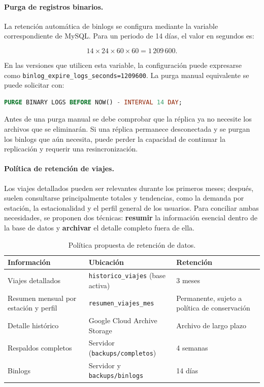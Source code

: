 \documentclass[10pt,a4paper]{article}
\begin{document}
\paragraph{Purga de registros binarios.}
La retención automática de binlogs se configura mediante la variable correspondiente de MySQL. Para un periodo de 14 días, el valor en segundos es:

\[
14 \times 24 \times 60 \times 60 = 1\,209\,600.
\]

En las versiones que utilicen esta variable, la configuración puede expresarse como 
\texttt{binlog\_expire\_logs\_seconds=1209600}. La purga manual equivalente se puede solicitar con:

\begin{lstlisting}[language=SQL]
PURGE BINARY LOGS BEFORE NOW() - INTERVAL 14 DAY;
\end{lstlisting}

Antes de una purga manual se debe comprobar que la réplica ya no necesite los archivos que se eliminarán. Si una réplica permanece desconectada y se purgan los binlogs que aún necesita, puede perder la capacidad de continuar la replicación y requerir una resincronización.

\paragraph{Política de retención de viajes.}
Los viajes detallados pueden ser relevantes durante los primeros meses; después, suelen consultarse principalmente totales y tendencias, como la demanda por estación, la estacionalidad y el perfil general de los usuarios. Para conciliar ambas necesidades, se proponen dos técnicas: \textbf{resumir} la información esencial dentro de la base de datos y \textbf{archivar} el detalle completo fuera de ella.

\begin{table}[htbp]
    \centering
    \small
    \begin{tabular}{|p{4.3cm}|p{5.3cm}|p{3.6cm}|}
        \hline
        \textbf{Información} & \textbf{Ubicación} & \textbf{Retención} \\ \hline
        Viajes detallados & \texttt{historico\_viajes} (base activa) & 3 meses \\ \hline
        Resumen mensual por estación y perfil & \texttt{resumen\_viajes\_mes} & Permanente, sujeto a política de conservación \\ \hline
        Detalle histórico & Google Cloud Archive Storage & Archivo de largo plazo \\ \hline
        Respaldos completos & Servidor (\texttt{backups/completos}) & 4 semanas \\ \hline
        Binlogs & Servidor y \texttt{backups/binlogs} & 14 días \\ \hline
    \end{tabular}
    \caption{Política propuesta de retención de datos.}
    \label{tab:retencion-datos}
\end{table}
\end{document}
